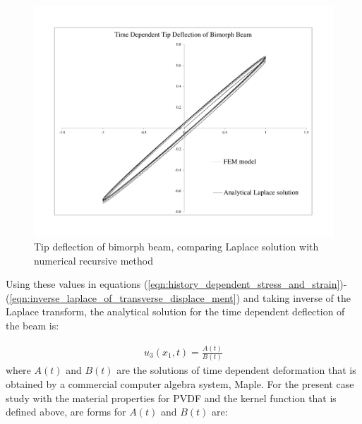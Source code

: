 \begin{figure}
\centering 
\includegraphics[width=6.0in]{./chap_4_structural_analyses/pdf_beam/result_tip_deflection_of_bimorph_beam.pdf}
\caption{Tip deflection of bimorph beam, comparing Laplace solution with numerical recursive method}
\label{fig:result_tip_deflection_of_bimorph_beam}
\end{figure}
Using these values in equations (\ref{eqn:history_dependent_stress_and_strain})-(\ref{eqn:inverse_laplace_of_transverse_displace_ment}) and taking inverse of the Laplace transform,
 the analytical solution for the time dependent deflection of the beam is:

\begin{equation}
\begin{aligned}
u_3(x_1,t)=\frac{A(t)}{B(t)}
\end{aligned}
\label{EQN:PVDF_beam_closed_form_solution}
\end{equation}
where $A(t)$ and $B(t)$ are the solutions of time dependent deformation that is obtained by a commercial computer algebra system, Maple.
For the present case study with the material properties for PVDF and the kernel function that is defined above, are forms for $A(t)$ and $B(t)$ are:

